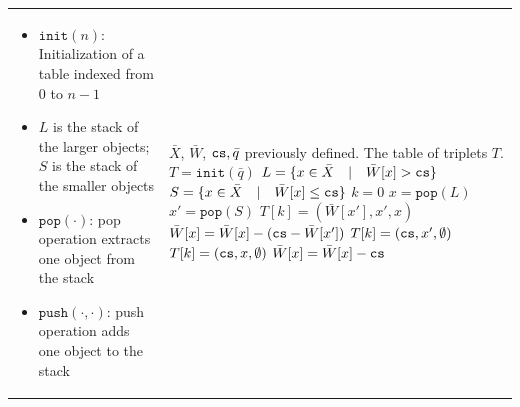 \begin{algorithm}[htb]
\begin{tabular}{l l}
\begin{minipage}{0.48\textwidth}
            \begin{itemize}
                \scriptsize
                \item $\texttt{init}(n)$: Initialization of a table indexed from $0$ to $n-1$
                \item $L$ is the stack of the larger objects; $S$ is the stack of the smaller objects
                \item $\texttt{pop}(\cdot)$: pop operation extracts one object from the stack
                \item $\texttt{push}(\cdot, \cdot)$: push operation adds one object to the stack
            \end{itemize}
            
        \end{minipage} 
        &
                \begin{minipage}{0.5\textwidth}
            \begin{algorithmic}[1]
                \scriptsize
                \renewcommand{\algorithmicrequire}{\textbf{Input:}}
                \renewcommand{\algorithmicensure}{\textbf{Output:}}
                \Require $\bar{X}$, $\bar{W}$, $\cs, \bar{q}$ previously defined.
                \Ensure  The table of triplets $T$.
                \Function{TableBuilding}{$\bar{X}$, $\bar{W}$, $\cs, \bar{q}$}
                    \State $T = \texttt{init}(\bar{q})$ %
                    \State $L = \{x \in \bar{X} \quad | \quad \bar{W}[x] > \texttt{cs}\}$ \Comment{$L$ is the stack of the larger objects}
                    \State $S = \{x \in \bar{X} \quad | \quad \bar{W}[x] \leq \texttt{cs}\}$ \Comment{$S$ is the stack of the smaller objects}
                    \State $k = 0$
                    \While{$L$ is not empty}
                        \State $x = \texttt{pop}(L)$ %
                        \If{$S$ is not empty}
                            \State $x' = \texttt{pop}(S)$
                            \If{$\bar{W}[x'] < \cs$}
                                \State $T[k] = (\bar{W}[x'], x', x)$
                                \State $\bar{W}[x] = \bar{W}[x] - (\texttt{cs} - \bar{W}[x'])$
                            \Else
                                \State $T[k] = (\texttt{cs}, x', \emptyset)$
                            \EndIf
                        \Else
                            \State $T[k] = (\texttt{cs}, x, \emptyset)$
                            \State $\bar{W}[x] = \bar{W}[x] - \texttt{cs}$
                        \EndIf

\end{algorithmic}
\end{minipage}
\end{tabular}
\end{algorithm}

